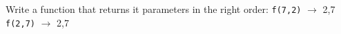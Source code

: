 \begin{Exercise}[title={Integer ordering},difficulty=3]
\label{ex:ordering function}
\Question Write a function that returns it parameters in the right
order:\newline 
\lstinline{f(7,2)} $\rightarrow$ 2,7\newline
\lstinline{f(2,7)} $\rightarrow$ 2,7\newline
\end{Exercise}

\begin{Answer}
\Question

\end{Answer}


